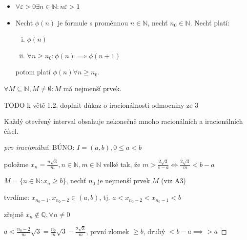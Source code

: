 \begin{poznamka}
  \begin{itemize}
    \item $\forall \varepsilon > 0 \exists n \in \mathbb N: n\varepsilon > 1$
    \item Nechť $\phi (n)$ je formule s proměnnou $n \in \mathbb N$, nechť $n_0 \in \mathbb N$. Nechť platí:
    \begin{enumerate}[i.]
      \item $\phi(n)$
      \item $\forall n \geq n_0: \phi (n) \implies \phi (n+1)$
    \end{enumerate}
    potom platí $\phi (n) \forall n \geq n_0$.
  \end{itemize}
\end{poznamka}

\begin{poznamka}
  $\forall M \subseteq \mathbb N, M \neq \emptyset: M$ má nejmenší prvek.
\end{poznamka}

TODO k větě 1.2. doplnit důkaz o iracionálnosti odmocniny ze 3

\begin{veta}
  Každý otevřený interval obsahuje nekonečně mnoho racionálních a iracionálních čísel.
\end{veta}

\begin{proof}[pro iracionální]
  BÚNO: $I = (a,b), 0 \leq a < b$

  položme $x_n = \frac{n\sqrt{3}}{m}, n \in \mathbb N, m \in \mathbb N$ velké tak, že $m > \frac{2\sqrt{3}}{b-a}\iff \frac{2\sqrt{3}}{m} < b-a$

  $M = \{n \in \mathbb N:x_n \geq b\}$, nechť $n_0$ je nejmenší prvek $M$ (viz A3)

  tvrdíme: $x_{n_0-1}, x_{n_0-2}\in (a,b)$, tj. $a<x_{n_0-2}<x_{n_0-1}<b$

  zřejmě $x_n \notin \mathbb Q, \forall n \neq 0$

  $a<\frac{n_0-2}{m} \sqrt{3}=\frac{n_0}{m} \sqrt{3} - \frac{2\sqrt{3}}{m}$, první zlomek $\geq b$, druhý $< b-a \implies >a$
\end{proof}


